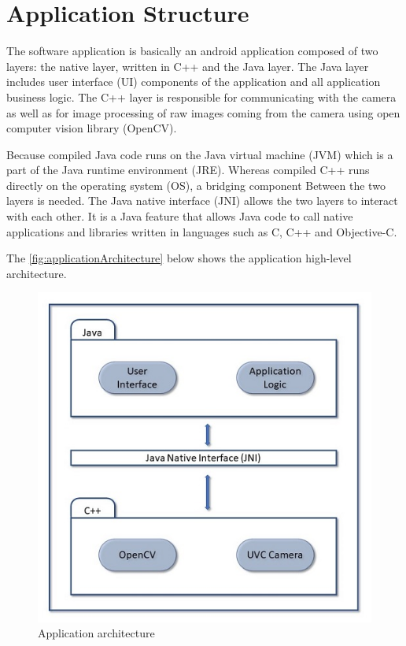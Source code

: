\section{Application Structure}
The software application is basically an android application composed of two layers: the native layer, written in C++ and the Java layer. 
The Java layer includes user interface (UI) components of the application and all application business logic. 
The C++ layer is responsible for communicating with the camera as well as for image processing of raw images coming from the camera using open computer vision library (OpenCV).

Because compiled Java code runs on the Java virtual machine (JVM) which is a part of the Java runtime environment (JRE). Whereas compiled C++ runs directly on the operating system (OS), a bridging component Between the two layers is needed.
The Java native interface (JNI) allows the two layers to interact with each other. It is a Java feature that allows Java code to call native applications and libraries written in languages such as C, C++ and Objective-C.

The \autoref{fig:applicationArchitecture} below shows the application high-level architecture.


\begin{figure}[H]
\centering
\includegraphics{figures/applicationArchitecture.JPG}
\caption[Application architecture]{Application architecture}\label{fig:applicationArchitecture}
\end{figure}



